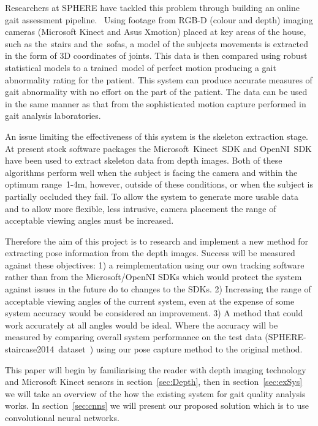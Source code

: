 \documentclass[11pt]{article} %
\begin{document}
Researchers at SPHERE have tackled this problem through building an online gait assessment pipeline.~\cite{Paiement} Using footage from RGB-D (colour and depth) imaging cameras (Microsoft Kinect and Asus Xmotion) placed at key areas of the house, such as the~stairs and the~sofas, a model of the subjects movements is extracted in the form of 3D coordinates of joints. This data is then compared using robust statistical models to a trained~model of perfect motion producing a gait abnormality rating for the patient. This system can produce accurate measures of gait abnormality with no effort on the part of the patient. The data can be used in the same manner as that from the sophisticated motion capture performed in gait analysis laboratories. %

An issue limiting the effectiveness of this system is the skeleton extraction stage. At present stock software packages the Microsoft~Kinect~SDK and OpenNI~SDK have been used to extract skeleton data from depth images. Both of these algorithms perform well when the subject is facing the camera and within the optimum range~1-4m, however, outside of these conditions, or when the subject is partially occluded they fail. To allow the system to generate more usable data and to allow more flexible, less intrusive, camera placement the range of acceptable viewing angles must be increased. 

Therefore the aim of this project is to research and implement a new method for extracting pose information from the depth images. Success will be measured against these objectives: 1) a reimplementation using our own tracking software rather than from the Microsoft/OpenNI SDKs which would protect the system against issues in the future do to changes to the SDKs. 2) Increasing the range of acceptable viewing angles of the current system, even at the expense of some system accuracy would be considered an improvement. 3) A method that could work accurately at all angles would be ideal. Where the accuracy will be measured by comparing overall system performance on the test data (SPHERE-staircase2014~dataset~\cite{Paiement}) using our pose capture method to the original method.

This paper will begin by familiarising the reader with depth imaging technology and Microsoft Kinect sensors in section~\ref{sec:Depth}, then in section~\ref{sec:exSys} we will take an overview of the how the existing system for gait quality analysis works. In section~\ref{sec:cnns} we will present our proposed solution which is to use convolutional neural networks.  
\end{document}
